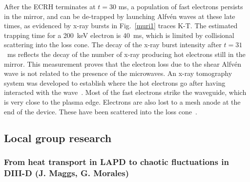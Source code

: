 \documentclass[11pt]{article}
\renewcommand{\cite}{\citep}
\begin{document}
After the ECRH terminates at $t = 30$ ms, a population of fast electrons
persists in the mirror, and can be de-trapped by launching Alfvén waves
at these late times, as evidenced by x-ray bursts in Fig.~\ref{muri1} traces K-T.
The estimated trapping time for a 200~keV electron is 40~ms, which is
limited by collisional scattering into the loss cone. The
decay of the x-ray burst intensity after $t = 31$~ms reflects the decay of
the number of x-ray producing hot electrons still in the mirror. This
measurement proves that the electron loss due to the shear Alfvén wave
is not related to the presence of the microwaves. An x-ray tomography
system was developed to establish where the hot electrons go after having
interacted with the wave~\cite{wang:2013}. Most of the fast electrons strike the
waveguide, which is very close to the plasma edge. Electrons are also
lost to a mesh anode at the end of the device. These have been scattered
into the loss cone~\cite{wang:2014}.




\subsection{Local group research}

\subsubsection{From heat transport in LAPD to chaotic fluctuations in DIII-D (J.
Maggs, G. Morales)}
\end{document}
